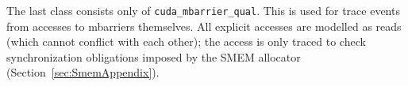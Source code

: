  The last class consists only of \texttt{cuda\_mbarrier\_qual}.
This is used for trace events from accesses to mbarriers themselves.
All explicit accesses are modelled as reads (which cannot conflict with each other);
the access is only traced to check synchronization obligations
imposed by the SMEM allocator (Section~\ref{sec:SmemAppendix}).

